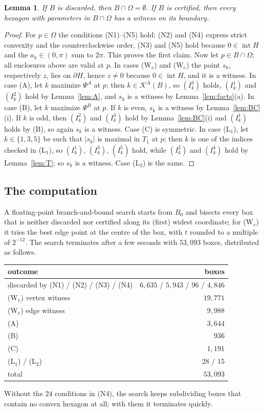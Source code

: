 \documentclass[11pt]{amsart}
\newtheorem{lemma}[theorem]{Lemma}
\theoremstyle{definition}
\theoremstyle{remark}
\begin{document}
\begin{lemma}\label{lem:cert}
If $B$ is discarded, then $B\cap\Omega=\emptyset$. If $B$ is certified, then every hexagon with parameters in $B\cap\Omega$ has a witness on its boundary.
\end{lemma}

\begin{proof}
For $p\in\Omega$ the conditions (N1)--(N5) hold: (N2) and (N4) express strict convexity and the counterclockwise order, (N3) and (N5) hold because $0\in\operatorname{int}H$ and the $a_k\in(0,\pi)$ sum to $2\pi$. This proves the first claim. Now let $p\in B\cap\Omega$; all enclosures above are valid at $p$. In cases (W$_v$) and (W$_e$) the point $s_k$, respectively $z$, lies on $\partial H$, hence $z\ne0$ because $0\in\operatorname{int}H$, and it is a witness. In case (A), let $k$ maximize $\Psi^A$ at $p$; then $k\in\mathcal K^A(B)$, so $(I^3_k)$ holds, $(I^1_k)$ and $(I^2_k)$ hold by Lemma~\ref{lem:A}, and $s_k$ is a witness by Lemma~\ref{lem:facts}(a). In case (B), let $k$ maximize $\Psi^B$ at $p$. If $k$ is even, $s_k$ is a witness by Lemma~\ref{lem:BC}(i). If $k$ is odd, then $(I^2_k)$ and $(I^3_k)$ hold by Lemma~\ref{lem:BC}(i) and $(I^1_k)$ holds by (B), so again $s_k$ is a witness. Case (C) is symmetric. In case (L$_1$), let $k\in\{1,3,5\}$ be such that $\lvert s_k\rvert$ is maximal in $T_1$ at $p$; then $k$ is one of the indices checked in (L$_1$), so $(I^1_k)$, $(I^3_k)$, $(I^5_k)$ hold, while $(I^2_k)$ and $(I^4_k)$ hold by Lemma~\ref{lem:T}; so $s_k$ is a witness. Case (L$_2$) is the same.
\end{proof}

\subsection{The computation}
A floating-point branch-and-bound search starts from $B_0$ and bisects every box that is neither discarded nor certified along its (first) widest coordinate; for (W$_e$) it tries the best edge point at the centre of the box, with $t$ rounded to a multiple of $2^{-12}$. The search terminates after a few seconds with $53{,}093$ boxes, distributed as follows.
\begin{center}
\begin{tabular}{lr}
\toprule
outcome & boxes\\
\midrule
discarded by (N1) / (N2) / (N3) / (N4) & $6{,}635$ / $5{,}943$ / $96$ / $4{,}846$\\
(W$_v$) vertex witness & $19{,}771$\\
(W$_e$) edge witness & $9{,}988$\\
(A) & $3{,}644$\\
(B) & $936$\\
(C) & $1{,}191$\\
(L$_1$) / (L$_2$) & $28$ / $15$\\
\midrule
total & $53{,}093$\\
\bottomrule
\end{tabular}
\end{center}
Without the $24$ conditions in (N4), the search keeps subdividing boxes that contain no convex hexagon at all; with them it terminates quickly.
\end{document}
